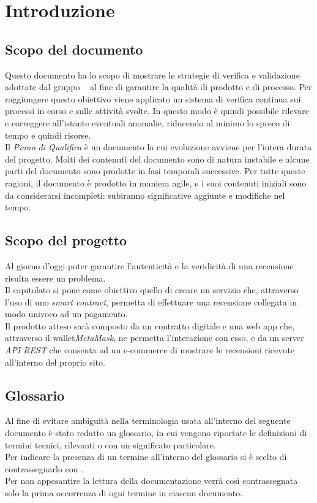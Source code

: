 \section{Introduzione}


\subsection{Scopo del documento}
Questo documento ha lo scopo di mostrare le strategie di verifica e validazione adottate dal gruppo \groupName ~ al fine di garantire la qualità di prodotto e di processo. Per raggiungere questo obiettivo viene applicato un sistema di verifica continua sui processi in corso e sulle attività svolte. In questo modo è quindi possibile rilevare e correggere all'istante eventuali anomalie, riducendo al minimo lo spreco di tempo e quindi risorse.\\
Il \textit{Piano di Qualifica} è un documento la cui evoluzione avviene per l'intera durata del progetto. Molti dei contenuti del documento sono di natura instabile e alcune parti del documento sono prodotte in fasi temporali successive. Per tutte queste ragioni, il documento è prodotto in maniera agile, e i suoi contenuti iniziali sono da considerarsi incompleti: subiranno significative aggiunte e modifiche nel tempo.




\subsection{Scopo del progetto}

Al giorno d'oggi poter garantire l'autenticità e la veridicità di una
recensione\glo \: risulta essere un problema. \\ Il capitolato \capName si
pone come obiettivo quello di creare un servizio che, attraverso l'uso di uno
\textit{smart contract}\glo \:, permetta di effettuare una recensione collegata in
modo univoco ad un pagamento. \\ Il prodotto atteso sarà composto da un
contratto digitale e una web app che, attraverso il wallet\glo  \textit{MetaMask}\glo \:, ne
permetta l'interazione con esso, e da un server \textit{API REST}\glo \: che consenta ad un
e-commerce\glo \: di mostrare le recensioni ricevute all'interno del proprio sito.

\subsection{Glossario}
Al fine di evitare ambiguità nella terminologia usata all'interno del seguente
documento è stato redatto un glossario, in cui vengono riportate le definizioni
di termini tecnici, rilevanti o con un significato particolare. \\ Per indicare
la presenza di un termine all'interno del glossario si è scelto di
contrassegnarlo con \glo .\\ Per non appesantire la lettura della documentazione
verrà così contrassegnata solo la prima occorrenza di ogni termine in ciascun
documento.

